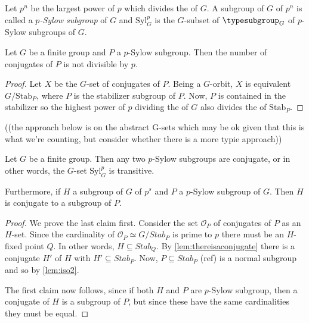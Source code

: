 \begin{definition}
  \label{def:sylowsubgroup}
  Let $p^n$ be the largest power of $p$ which divides the \gporder of $G$.  A subgroup of $G$ of \gporder $p^n$ is called a \emph{$p$-Sylow subgroup} of $G$ and $\mathrm{Syl}_G^p$ is the $G$-subset of $\typesubgroup_G$ of $p$-Sylow subgroups of $G$.
\end{definition}
\begin{lemma}
  \label{lem:numberofconjofSylow}
  Let $G$ be a finite group and $P$ a $p$-Sylow subgroup.  Then the number of conjugates of $P$ is not divisible by $p$.
\end{lemma}
\begin{proof}
  Let $X$ be the $G$-set of conjugates of $P$.  Being a $G$-orbit, $X$ is equivalent $G/\mathrm{Stab}_P$, where $P$ is the stabilizer subgroup of $P$.  Now, $P$ is contained in the stabilizer so the highest power of $p$ dividing the \gporder of $G$ also divides the \gporder of $\mathrm{Stab}_P$.
\end{proof}


  ((the approach below is on the abstract G-sets which may be ok given that this is what we're counting, but consider whether there is a more typie approach))
\begin{theorem}
  \label{thm:sylow2}%
  \label{lem:sylowsareconjugates}
  Let $G$ be a finite group.  Then any two $p$-Sylow subgroups are conjugate, or in other words,  the $G$-set $\mathrm{Syl}_G^p$ is transitive.

Furthermore, if $H$ a subgroup of $G$ of \gporder $p^s$ and $P$ a $p$-Sylow subgroup of $G$.  Then $H$ is conjugate to a subgroup of $P$.
\end{theorem}

\begin{proof}
  We prove the last claim first.
  Consider the set $\mathcal O_P$ of conjugates of $P$ as an $H$-set.  Since the cardinality of $\mathcal O_P\simeq G/Stab_P$ is prime to $p$ there must be an $H$-fixed point $Q$.  In other words, $H\subseteq Stab_Q$.  By \cref{lem:thereisaconjugate} there is a conjugate $H'$ of $H$ with $H'\subseteq Stab_P$.  Now, $P\subseteq Stab_P$ (ref) is a normal subgroup and so by \cref{lem:iso2}.

The first claim now follows, since if both $H$ and $P$ are $p$-Sylow subgroup, then a conjugate of $H$ is a subgroup of $P$, but since these have the same cardinalities they must be equal.
\end{proof}




